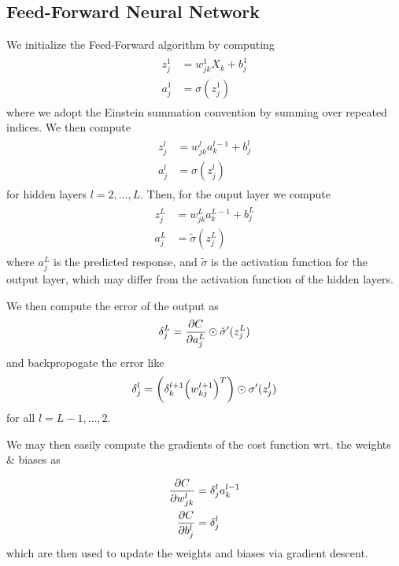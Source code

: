 \documentclass[reprint, english, nofootinbib]{revtex4-2}
\begin{document}
\subsection{Feed-Forward Neural Network}
\noindent
We initialize the Feed-Forward algorithm by computing
\begin{align}\label{eqn: FeedForward Initial}
    \begin{split}
        z^1_j &= w^1_{jk}X_k + b^1_j \\
        a^1_j &= \sigma(z^1_j)
    \end{split}
\end{align}
where we adopt the Einstein summation convention by summing over repeated indices.
We then compute
\begin{align}
    \begin{split}
        z^l_{j} &= w^l_{jk}a^{l-1}_k + b^l_j \\
        a^l_{j} &= \sigma(z^l_{j})
    \end{split}
\end{align}
for hidden layers $l = 2, \dots, L$. Then, for the ouput layer we compute
\begin{align}
    \begin{split}
        z^{L}_j &= w^{L}_{jk}a^{L-1}_k + b^{L}_j \\
        a^{L}_j &= \tilde\sigma(z^{L}_j)
    \end{split}
\end{align}
where $a^{L}_j$ is the predicted response, and $\tilde\sigma$ is the activation function for the output layer, which may differ from the activation function of the hidden layers.

We then compute the error of the output as
\begin{equation}
    \delta^{L}_j = \pdv{C}{a^{L}_{j}} \odot \tilde\sigma'(z^{L}_j)
\end{equation}
and backpropogate the error like
\begin{equation}
    \delta^{l}_j = \qty(\delta^{l+1}_{k}\qty(w^{l+1}_{kj})^T) \odot \sigma'(z^l_j)
\end{equation}
for all $l = L-1, \dots, 2$.

We may then easily compute the gradients of the cost function wrt. the weights \& biases as

\begin{align}
    \begin{split}
        \pdv{C}{w_{jk}^l} &= \delta_j^l a^{l-1}_k \\
        \pdv{C}{b^l_j} &= \delta_j^l
    \end{split}
\end{align}
which are then used to update the weights and biases via gradient descent.
\end{document}
